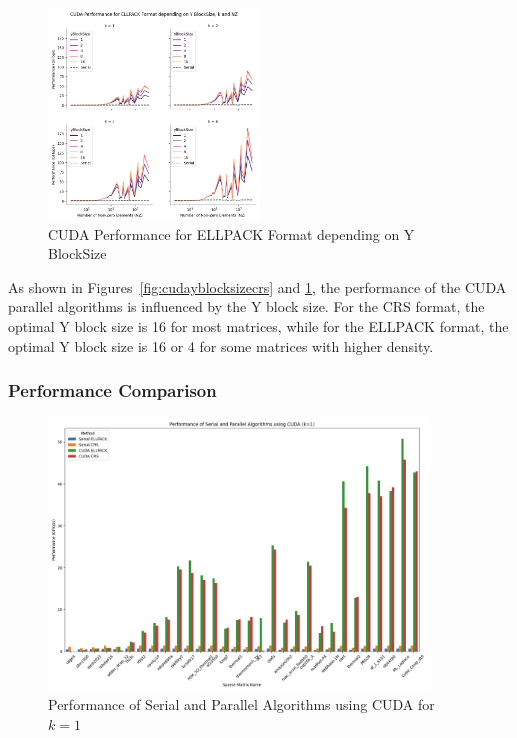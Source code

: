 \documentclass[12pt,oneside]{book} %
\begin{document}
\begin{figure}[H]
    \centering
    \includegraphics[width=0.5\textwidth]{../results/images/CUDA_yBlockSize_ELLPACK.png}
    \caption{CUDA Performance for ELLPACK Format depending on Y BlockSize}
    \label{fig:cudayblocksizeellpack}
\end{figure}

As shown in Figures~\ref{fig:cudayblocksizecrs} and
\ref{fig:cudayblocksizeellpack}, the performance of the CUDA parallel
algorithms is influenced by the Y block size. For the CRS format, the optimal Y
block size is 16 for most matrices, while for the ELLPACK format, the optimal Y
block size is 16 or 4 for some matrices with higher density.

\subsubsection{Performance Comparison}

\begin{figure}[H]
    \centering
    \includegraphics[width=0.9\textwidth]{../results/images/CUDA_Performance_k1.png}
    \caption{Performance of Serial and Parallel Algorithms using CUDA for $k=1$}
    \label{fig:cuda-performance-k1}
\end{figure}
\end{document}
